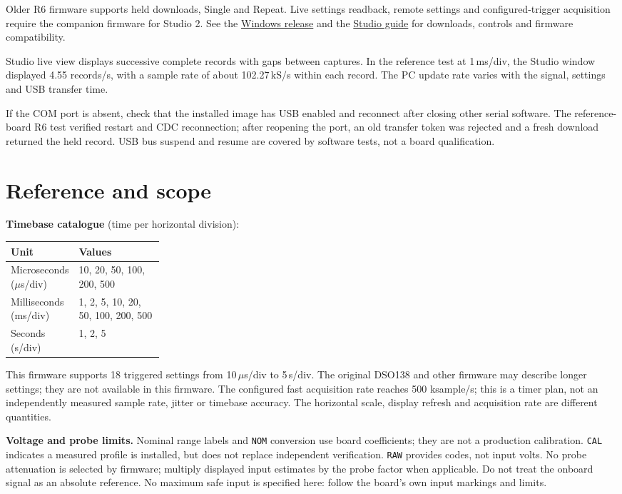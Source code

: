 \documentclass[10pt,a4paper]{article}
\newcommand{\lcd}[1]{\texttt{#1}}
\newcommand{\manualpage}[2]{\clearpage\section{#1}\label{#2}}
\begin{document}
Older R6 firmware supports held downloads, Single and Repeat. Live settings readback, remote settings and configured-trigger acquisition require the companion firmware for Studio 2. See the \href{https://github.com/dodekm/dso138-firmware/releases/tag/studio-v2.0.0}{Windows release} and the \href{https://github.com/dodekm/dso138-firmware/blob/main/host/windows/README.md}{Studio guide} for downloads, controls and firmware compatibility.

Studio live view displays successive complete records with gaps between captures. In the reference test at 1\,ms/div, the Studio window displayed 4.55 records/s, with a sample rate of about 102.27\,kS/s within each record. The PC update rate varies with the signal, settings and USB transfer time.

If the COM port is absent, check that the installed image has USB enabled and reconnect after closing other serial software. The reference-board R6 test verified restart and CDC reconnection; after reopening the port, an old transfer token was rejected and a fresh download returned the held record. USB bus suspend and resume are covered by software tests, not a board qualification.

\manualpage{Reference and scope}{reference}

\textbf{Timebase catalogue} (time per horizontal division):\par\smallskip
\begin{tabularx}{\linewidth}{@{}p{0.25\linewidth}X@{}}
\toprule
Unit & Values \\
\midrule
Microseconds (\(\mu\)s/div) & 10, 20, 50, 100, 200, 500 \\
Milliseconds (ms/div) & 1, 2, 5, 10, 20, 50, 100, 200, 500 \\
Seconds (s/div) & 1, 2, 5 \\
\bottomrule
\end{tabularx}

This firmware supports 18 triggered settings from 10\,$\mu$s/div to 5\,s/div. The original DSO138 and other firmware may describe longer settings; they are not available in this firmware. The configured fast acquisition rate reaches 500 ksample/s; this is a timer plan, not an independently measured sample rate, jitter or timebase accuracy. The horizontal scale, display refresh and acquisition rate are different quantities.

\textbf{Voltage and probe limits.} Nominal range labels and \lcd{NOM} conversion use board coefficients; they are not a production calibration. \lcd{CAL} indicates a measured profile is installed, but does not replace independent verification. \lcd{RAW} provides codes, not input volts. No probe attenuation is selected by firmware; multiply displayed input estimates by the probe factor when applicable. Do not treat the onboard signal as an absolute reference. No maximum safe input is specified here: follow the board's own input markings and limits.
\end{document}
